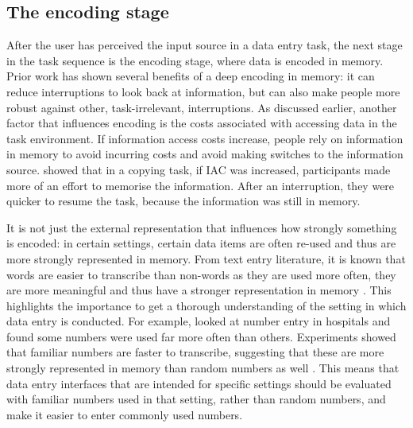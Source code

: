 
\subsection{The encoding stage}\label{sec:Encoding_stage}
After the user has perceived the input source in a data entry task, the next stage in the task sequence is the encoding stage, where data is encoded in memory. Prior work has shown several benefits of a deep encoding in memory: it can reduce interruptions to look back at information, but can also make people more robust against other, task-irrelevant, interruptions. As discussed earlier, another factor that  influences encoding is the costs associated with accessing data in the task environment. If information access costs increase, people rely on information in memory to avoid incurring costs and avoid making switches to the information source. \citet{Morgan2009} showed that in a copying task, if IAC was increased, participants made more of an effort to memorise the information. After an interruption, they were quicker to resume the task, because the information was still in memory. 

It is not just the external representation that influences how strongly something is encoded: in certain settings, certain data items are often re-used and thus are more strongly represented in memory. From text entry literature, it is known that words are easier to transcribe than non-words as they are used more often, they are more meaningful and thus have a stronger representation in memory \citep{Salthouse1986}. This highlights the importance to get a thorough understanding of the setting in which data entry is conducted. For example, \citet{Wiseman2013a} looked at number entry in hospitals and found some numbers were used far more often than others. Experiments showed that familiar numbers are faster to transcribe, suggesting that these are more strongly represented in memory than random numbers as well \citep{Wiseman2014}. This means that data entry interfaces that are intended for specific settings should be evaluated with familiar numbers used in that setting, rather than random numbers, and make it easier to enter commonly used numbers. 

